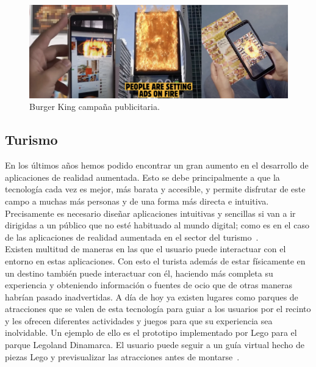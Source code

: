 \begin{figure}[H]
     \centering
     \includegraphics[width=\textwidth]{Images/BurgerKing_Add.png}
     \caption[Burger King campaña publicitaria]{Burger King campaña publicitaria\footnotemark.}
     \label{fig:nikeAR}
 \end{figure}
 

\subsection{Turismo}
En los últimos años hemos podido encontrar un gran aumento en el desarrollo de aplicaciones de realidad aumentada. Esto se debe principalmente a que la tecnología cada vez es mejor, más barata y accesible, y permite disfrutar de este campo a muchas más personas y de una forma más directa e intuitiva. Precisamente es necesario diseñar aplicaciones intuitivas y sencillas si van a ir dirigidas a un público que no esté habituado al mundo digital; como es en el caso de las aplicaciones de realidad aumentada en el sector del turismo~\cite{Neosentec_Tur}.\\

Existen multitud de maneras en las que el usuario puede interactuar con el entorno en estas aplicaciones. Con esto el turista además de estar físicamente en un destino también puede interactuar con él, haciendo más completa su experiencia y obteniendo información o fuentes de ocio que de otras maneras habrían pasado inadvertidas. A día de hoy ya existen lugares como parques de atracciones que se valen de esta tecnología para guiar a los usuarios por el recinto y les ofrecen diferentes actividades y juegos para que su experiencia sea inolvidable. Un ejemplo de ello es el prototipo implementado por Lego para el parque Legoland Dinamarca. El usuario puede seguir a un guía virtual hecho de piezas Lego y previsualizar las atracciones antes de montarse~\cite{twitter_lego}.\\

